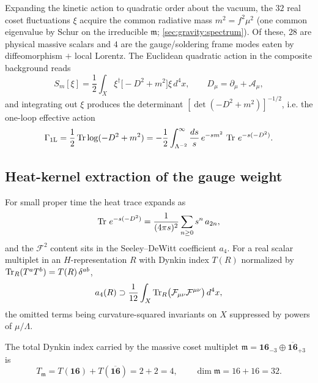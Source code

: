 Expanding the kinetic action to quadratic order about the vacuum, the
$32$ real coset fluctuations $\xi$ acquire the common radiative mass
$m^{2}=f^{2}\mu^{2}$ (one common eigenvalue by Schur on the irreducible
$\mathfrak m$; \autoref{sec:gravity:spectrum}). Of these, $28$ are
physical massive scalars and $4$ are the gauge/soldering frame modes
eaten by diffeomorphism $+$ local Lorentz. The Euclidean quadratic
action in the composite background reads
\begin{equation}\label{eq:app-ym:Squad}
  S_{m}[\xi]
  =\frac12\int_{X}\xi^{\dagger}\bigl[-D^{2}+m^{2}\bigr]\xi\,d^{4}x,
  \qquad
  D_{\mu}=\partial_{\mu}+\mathcal A_{\mu},
\end{equation}
and integrating out $\xi$ produces the determinant
$[\det(-D^{2}+m^{2})]^{-1/2}$, i.e. the one-loop effective action
\begin{equation}\label{eq:app-ym:W}
  \Gamma_{\mathrm{1L}}
  =\frac12\operatorname{Tr}\log(-D^{2}+m^{2})
  =-\frac12\int_{\Lambda^{-2}}^{\infty}\frac{ds}{s}\,
    e^{-sm^{2}}\,\operatorname{Tr}\,e^{-s(-D^{2})}.
\end{equation}

\subsection{Heat-kernel extraction of the gauge weight}
\label{sec:app-ym:heatkernel}

For small proper time the heat trace expands as
\begin{equation}\label{eq:app-ym:HK}
  \operatorname{Tr}\,e^{-s(-D^{2})}
  =\frac{1}{(4\pi s)^{2}}\sum_{n\ge0}s^{n}\,a_{2n},
\end{equation}
and the $\mathcal F^{2}$ content sits in the Seeley--DeWitt coefficient
$a_{4}$. For a real scalar multiplet in an $H$-representation $R$ with
Dynkin index $T(R)$ normalized by
$\operatorname{Tr}_{R}(T^{a}T^{b})=T(R)\,\delta^{ab}$,
\begin{equation}\label{eq:app-ym:a4}
  a_{4}(R)\supset
  \frac{1}{12}\int_{X}\operatorname{Tr}_{R}\bigl(\mathcal F_{\mu\nu}
  \mathcal F^{\mu\nu}\bigr)\,d^{4}x ,
\end{equation}
the omitted terms being curvature-squared invariants on $X$ suppressed
by powers of $\mu/\Lambda$.

\begin{lemma}
\label{lem:app-ym:weight}
The total Dynkin index carried by the massive coset multiplet
$\mathfrak m=\mathbf{16}_{-3}\oplus\overline{\mathbf{16}}_{+3}$ is
\begin{equation}\label{eq:app-ym:Ttot}
  T_{\mathfrak m}
  =T(\mathbf{16})+T(\overline{\mathbf{16}})
  =2+2=4 ,
  \qquad
  \dim\mathfrak m=16+16=32 .
\end{equation}
\end{lemma}

